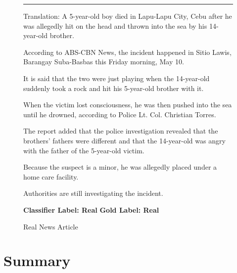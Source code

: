 \begin{figure}[h!]
{{                        \noindent\rule{0.5\textwidth}{0.4pt}\linebreak\linebreak

                          Translation:
                          A 5-year-old boy died in Lapu-Lapu City, Cebu after he was allegedly hit on the head and thrown into the sea by his 14-year-old brother.\linebreak

                          According to ABS-CBN News, the incident happened in Sitio Lawis, Barangay Suba-Basbas this Friday morning, May 10.\linebreak

                          It is said that the two were just playing when the 14-year-old suddenly took a rock and hit his 5-year-old brother with it.\linebreak

                          When the victim lost consciousness, he was then pushed into the sea until he drowned, according to Police Lt. Col. Christian Torres.\linebreak

                          The report added that the police investigation revealed that the brothers' fathers were different and that the 14-year-old was angry with the father of the 5-year-old victim.\linebreak

                          Because the suspect is a minor, he was allegedly placed under a home care facility.\linebreak

                          Authorities are still investigating the incident.\linebreak
                            \linebreak\linebreak

                            \textbf{Classifier Label: Real} \newline
                            \textbf{Gold Label: Real}

                        }
                      }
                         \caption{Real News Article}
                            \label{fig:real-article}
                        \end{figure}
\clearpage
\pagebreak
\section{Summary} \label{dataset-limitation}


